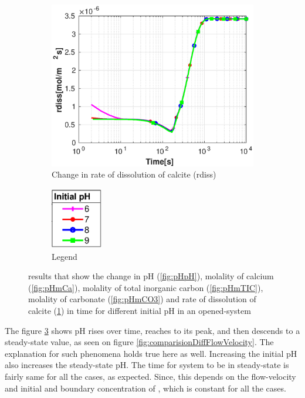 \begin{figure}[!h]
    \hfill
    \begin{subfigure}{.5\linewidth}
            \centering
        \includegraphics[width=\textwidth]{PICTURES/with_pH_rdiss.eps}
        \caption{Change in rate of dissolution of calcite (rdiss)}
        \label{fig:pHrdiss}
    \end{subfigure}%
  \hfill
  \begin{subfigure}{.5\linewidth}
            \centering
        \includegraphics[width=0.25\textwidth]{PICTURES/with_pH_legend.eps}
        \caption{Legend}
        \label{fig:pHlegend}
    \end{subfigure}%
    \caption{\DuMuX results that show the change in pH (\cref{fig:pHpH}), molality of calcium (\cref{fig:pHmCa}), 
    molality of total inorganic carbon (\cref{fig:pHmTIC}), molality of carbonate (\cref{fig:pHmCO3}) and rate of 
    dissolution of calcite (\cref{fig:pHrdiss}) in time for different initial pH in an opened-system}
    \label{fig:comparisionDiffInitialpH}
\end{figure}


The figure \ref{fig:comparisionDiffInitialpH} shows pH rises over time, reaches to its peak, and then descends to a steady-state value, as seen on figure \ref{fig:comparisionDiffFlowVelocity}. The explanation for such phenomena holds true here as well. Increasing the initial pH also increases the steady-state pH. The time for system to be in steady-state is fairly same for all the cases, as expected. Since, this depends on the flow-velocity and initial and boundary concentration of , which is constant for all the cases. 

